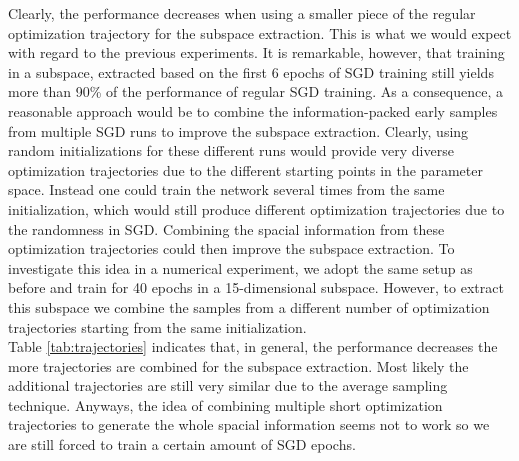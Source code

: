 \documentclass[11pt, a4paper]{article}
\begin{document}
Clearly, the performance decreases when using a smaller piece of the regular optimization trajectory for the subspace extraction. This is what we would expect with regard to the previous experiments. It is remarkable, however, that training in a subspace, extracted based on the first 6 epochs of SGD training still yields more than 90\% of the performance of regular SGD training. As a consequence, a reasonable approach would be to combine the information-packed early samples from multiple SGD runs to improve the subspace extraction. Clearly, using random initializations for these different runs would provide very diverse optimization trajectories due to the different starting points in the parameter space. Instead one could train the network several times from the same initialization, which would still produce different optimization trajectories due to the randomness in SGD. Combining the spacial information from these optimization trajectories could then improve the subspace extraction. To investigate this idea in a numerical experiment, we adopt the same setup as before and train for 40 epochs in a 15-dimensional subspace. However, to extract this subspace we combine the samples from a different number of optimization trajectories starting from the same initialization. \\

Table \ref{tab:trajectories} indicates that, in general, the performance decreases the more trajectories are combined for the subspace extraction. Most likely the additional trajectories are still very similar due to the average sampling technique.  Anyways, the idea of combining multiple short optimization trajectories to generate the whole spacial information seems not to work so we are still forced to train a certain amount of SGD epochs.
 
\end{document}
